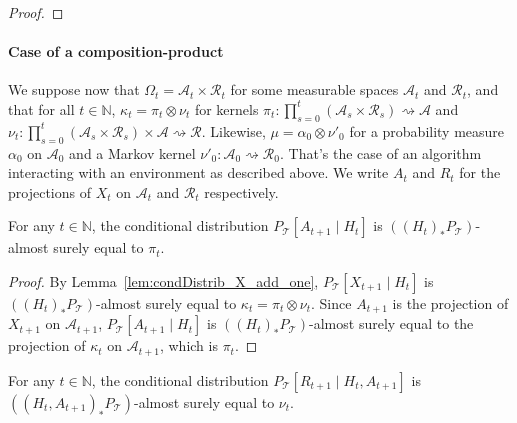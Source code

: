 \begin{proof}

\end{proof}


\paragraph{Case of a composition-product}

We suppose now that $\Omega_t = \mathcal{A}_t \times \mathcal{R}_t$ for some measurable spaces $\mathcal{A}_t$ and $\mathcal{R}_t$, and that for all $t \in \mathbb{N}$, $\kappa_t = \pi_t \otimes \nu_t$ for kernels $\pi_t : \prod_{s=0}^t(\mathcal{A}_s \times \mathcal{R}_s) \rightsquigarrow \mathcal{A}$ and $\nu_t : \prod_{s=0}^t(\mathcal{A}_s \times \mathcal{R}_s) \times \mathcal{A} \rightsquigarrow \mathcal{R}$.
Likewise, $\mu = \alpha_0 \otimes \nu'_0$ for a probability measure $\alpha_0$ on $\mathcal{A}_0$ and a Markov kernel $\nu'_0 : \mathcal{A}_0 \rightsquigarrow \mathcal{R}_0$.
That's the case of an algorithm interacting with an environment as described above.
We write $A_t$ and $R_t$ for the projections of $X_t$ on $\mathcal{A}_t$ and $\mathcal{R}_t$ respectively.


\begin{lemma}\label{lem:condDistrib_A_add_one}
  \leanok
For any $t \in \mathbb{N}$, the conditional distribution $P_{\mathcal{T}}\left[A_{t+1} \mid H_t\right]$ is $((H_t)_* P_{\mathcal{T}})$-almost surely equal to $\pi_t$.
\end{lemma}

\begin{proof}\leanok
By Lemma~\ref{lem:condDistrib_X_add_one}, $P_{\mathcal{T}}\left[X_{t+1} \mid H_t\right]$ is $((H_t)_* P_{\mathcal{T}})$-almost surely equal to $\kappa_t = \pi_t \otimes \nu_t$.
Since $A_{t+1}$ is the projection of $X_{t+1}$ on $\mathcal{A}_{t+1}$, $P_{\mathcal{T}}\left[A_{t+1} \mid H_t\right]$ is $((H_t)_* P_{\mathcal{T}})$-almost surely equal to the projection of $\kappa_t$ on $\mathcal{A}_{t+1}$, which is $\pi_t$.
\end{proof}


\begin{lemma}\label{lem:condDistrib_R_add_one}
  \leanok
For any $t \in \mathbb{N}$, the conditional distribution $P_{\mathcal{T}}\left[R_{t+1} \mid H_t, A_{t+1}\right]$ is $((H_t, A_{t+1})_* P_{\mathcal{T}})$-almost surely equal to $\nu_t$.
\end{lemma}

